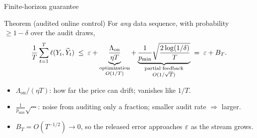 \begin{frame}{Finite-horizon guarantee}
  \begin{block}{Theorem (audited online control)}
    For \emph{any} data sequence, with probability $\ge 1-\delta$ over the audit draws,
    \[
      \frac1T\sum_{t=1}^{T}\ell(Y_t,\widetilde Y_t)\;\le\;
      \varepsilon
      +\underbrace{\frac{\Lambda_{\mathrm{on}}}{\eta T}}_{\substack{\text{optimization}\\ O(1/T)}}
      +\underbrace{\frac{1}{p_{\min}}\sqrt{\frac{2\log(1/\delta)}{T}}}_{\substack{\text{partial feedback}\\ O(1/\sqrt T)}}
      \;=\;\varepsilon+B_T.
    \]
  \end{block}
  \begin{itemize}
    \item $\Lambda_{\mathrm{on}}/(\eta T)$: how far the price can drift; vanishes like $1/T$.
    \item $\tfrac{1}{p_{\min}}\sqrt{\cdots}$: noise from auditing only a fraction;
          smaller audit rate $\Rightarrow$ larger.
    \item $B_T=O(T^{-1/2})\to0$, so the released error
          approaches $\varepsilon$ as the stream grows.
  \end{itemize}
\end{frame}
